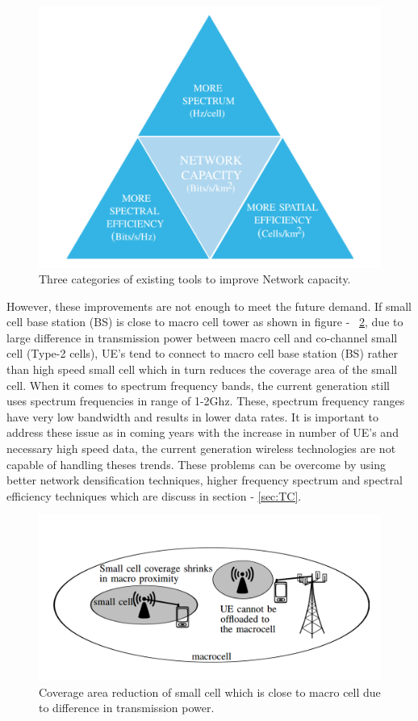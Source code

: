 \documentclass[12pt,onecolumn]{IEEEtran}
\begin{document}
\begin{figure}[ht]
\includegraphics[scale=0.3]{nwcp_class}
\centering
\caption{Three categories of existing tools to improve Network capacity.~\cite{main_paper}}
\label{fig:NWCP}
\end{figure}
However, these improvements are not enough to meet the future demand. If small cell base station (BS) is close to macro cell tower as shown in figure - ~\ref{fig:SMI}, due to large difference in transmission power between macro cell and co-channel small cell (Type-2 cells), UE's tend to connect to macro cell base station (BS) rather than high speed small cell which in turn reduces the coverage area of the small cell. When it comes to spectrum frequency bands, the current generation still uses spectrum frequencies in range of 1-2Ghz. These, spectrum frequency ranges have very low bandwidth and results in lower data rates.
It is important to address these issue as in coming years with the increase in number of UE's and necessary high speed data, the current generation wireless technologies are not capable of handling theses trends. These problems can be overcome by using better network densification techniques, higher frequency spectrum and spectral efficiency techniques which are discuss in section - \ref{sec:TC}.

\begin{figure}[ht]
\includegraphics[scale=0.4]{sm_inter}
\centering
\caption{Coverage area reduction of small cell which is close to macro cell due to difference in transmission power.~\cite{main_paper}}
\label{fig:SMI}
\end{figure}
\end{document}
